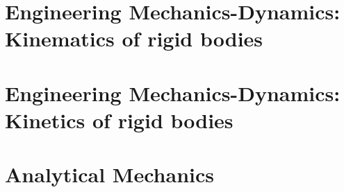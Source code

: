 \documentclass[]{book}
\begin{document}
\part{Engineering Mechanics-Dynamics: Kinematics of rigid bodies}
\part{Engineering Mechanics-Dynamics: Kinetics of rigid bodies}
\part{Analytical Mechanics}
\end{document}
